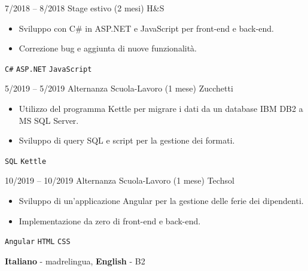 \documentclass[9pt]{developercv} %
\begin{document}
\vspace{-10 pt}
\begin{entrylist}
	\entry
		{7/2018 -- 8/2018}
		{Stage estivo (2 mesi)}
		{H\&S}
		{\vspace{-10pt}
        \begin{itemize}[noitemsep,topsep=0pt,parsep=0pt,partopsep=0pt, leftmargin=-1pt]
            \item Sviluppo con C# in ASP.NET e JavaScript per front-end e back-end.
            \item Correzione bug e aggiunta di nuove funzionalità.
        \end{itemize}
        \texttt{C\#} \slashsep \texttt{ASP.NET} \slashsep \texttt{JavaScript}}
	\entry
        {5/2019 -- 5/2019}
		{Alternanza Scuola-Lavoro (1 mese)}
		{Zucchetti}
		{\vspace{-10pt}
        \begin{itemize}[noitemsep,topsep=0pt,parsep=0pt,partopsep=0pt, leftmargin=-1pt]
            \item Utilizzo del programma Kettle per migrare i dati da un database IBM DB2 a MS SQL Server.
            \item Sviluppo di query SQL e script per la gestione dei formati.
        \end{itemize}
        \texttt{SQL} \slashsep \texttt{Kettle}}
	\entry
		{10/2019 -- 10/2019}
		{Alternanza Scuola-Lavoro (1 mese)}
		{Techsol}
		{\vspace{-10pt}
        \begin{itemize}[noitemsep,topsep=0pt,parsep=0pt,partopsep=0pt, leftmargin=-1pt]
            \item Sviluppo di un'applicazione Angular per la gestione delle ferie dei dipendenti.
            \item Implementazione da zero di front-end e back-end.
        \end{itemize}
        \texttt{Angular} \slashsep \texttt{HTML} \slashsep \texttt{CSS}}
\end{entrylist}

\vspace{-10 pt}
    \vspace{-6pt}

    \hspace{26mm} \textbf{ Italiano} - madrelingua, \textbf{English} - B2

\end{document}
